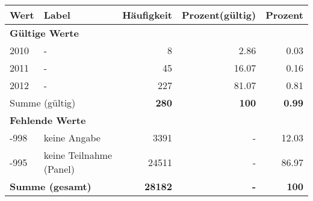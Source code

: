      \begin{longtable}{lXrrr}
     \toprule
     \textbf{Wert} & \textbf{Label} & \textbf{Häufigkeit} & \textbf{Prozent(gültig)} & \textbf{Prozent} \\
     \endhead
     \midrule
     \multicolumn{5}{l}{\textbf{Gültige Werte}}\\

     2010 &
     \multicolumn{1}{X}{ -  } &


       \num{8} &
       \num[round-mode=places,round-precision=2]{2,86} &
         \num[round-mode=places,round-precision=2]{0,03} \\

     2011 &
     \multicolumn{1}{X}{ -  } &


       \num{45} &
       \num[round-mode=places,round-precision=2]{16,07} &
         \num[round-mode=places,round-precision=2]{0,16} \\

     2012 &
     \multicolumn{1}{X}{ -  } &


       \num{227} &
       \num[round-mode=places,round-precision=2]{81,07} &
         \num[round-mode=places,round-precision=2]{0,81} \\
     \midrule
     \multicolumn{2}{l}{Summe (gültig)} &
       \textbf{\num{280}} &
     \textbf{100} &
       \textbf{\num[round-mode=places,round-precision=2]{0,99}} \\
     \multicolumn{5}{l}{\textbf{Fehlende Werte}}\\
       -998 &
       keine Angabe &
         \num{3391} &
        - &
         \num[round-mode=places,round-precision=2]{12,03} \\
       -995 &
       keine Teilnahme (Panel) &
         \num{24511} &
        - &
         \num[round-mode=places,round-precision=2]{86,97} \\
     \midrule
     \multicolumn{2}{l}{\textbf{Summe (gesamt)}} &
          \textbf{\num{28182}} &
        \textbf{-} &
        \textbf{100} \\
     \bottomrule
     \end{longtable}
     
